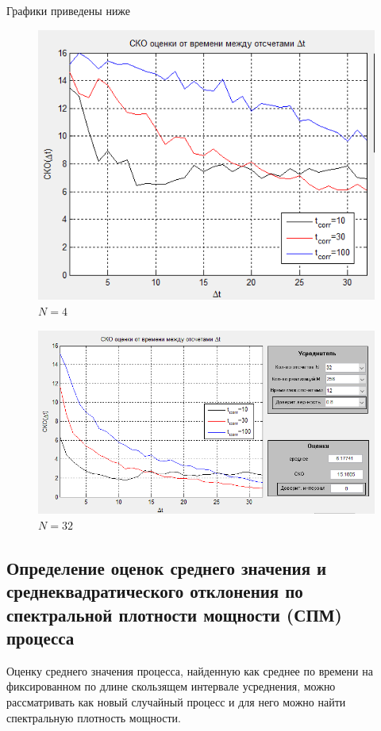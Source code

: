 \begin{enumerate}
Графики приведены ниже
\begin{figure}[H]
	\centering
    \includegraphics[width=\linewidth]{fig/fig41}
	\caption{$N = 4$}
    \label{fig:4.1}
\end{figure}

\begin{figure}[H]
	\centering
    \includegraphics[width=\linewidth]{fig/fig42}
	\caption{$N = 32$}
    \label{fig:4.2}
\end{figure}
\end{enumerate}
\subsection[Задание 5]{Определение оценок среднего значения и среднеквадратического отклонения по спектральной плотности мощности (СПМ) процесса}
Оценку среднего значения процесса, найденную как среднее по времени на фиксированном по длине скользящем интервале усреднения, можно рассматривать как новый случайный процесс и для него можно найти спектральную плотность мощности.

